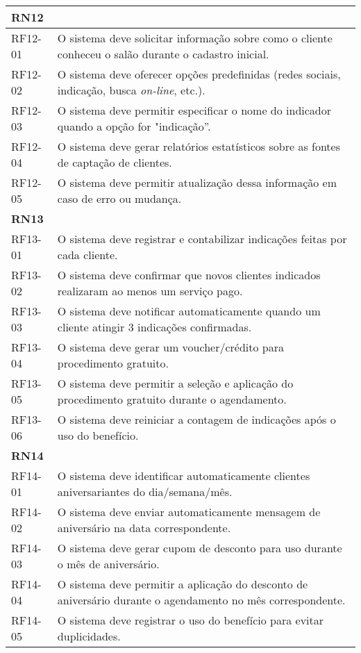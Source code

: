 \begin{longtable}{|p{}|p{}|}
	\multicolumn{2}{|l|}{\textbf{RN12}} \\ \hline
	RF12-01 & O sistema deve solicitar informação sobre como o cliente conheceu o salão durante o cadastro inicial. \\ \hline
	RF12-02 & O sistema deve oferecer opções predefinidas (redes sociais, indicação, busca \emph{on-line}, etc.). \\ \hline
	RF12-03 & O sistema deve permitir especificar o nome do indicador quando a opção for "indicação”. \\ \hline
	RF12-04 & O sistema deve gerar relatórios estatísticos sobre as fontes de captação de clientes. \\ \hline
	RF12-05 & O sistema deve permitir atualização dessa informação em caso de erro ou mudança. \\ \hline
	
	\multicolumn{2}{|l|}{\textbf{RN13}} \\ \hline
	RF13-01 & O sistema deve registrar e contabilizar indicações feitas por cada cliente. \\ \hline
	RF13-02 & O sistema deve confirmar que novos clientes indicados realizaram ao menos um serviço pago. \\ \hline
	RF13-03 & O sistema deve notificar automaticamente quando um cliente atingir 3 indicações confirmadas. \\ \hline
	RF13-04 & O sistema deve gerar um voucher/crédito para procedimento gratuito. \\ \hline
	RF13-05 & O sistema deve permitir a seleção e aplicação do procedimento gratuito durante o agendamento. \\ \hline
	RF13-06 & O sistema deve reiniciar a contagem de indicações após o uso do benefício. \\ \hline
		
	\multicolumn{2}{|l|}{\textbf{RN14}} \\ \hline
	RF14-01 & O sistema deve identificar automaticamente clientes aniversariantes do dia/semana/mês. \\ \hline
	RF14-02 & O sistema deve enviar automaticamente mensagem de aniversário na data correspondente. \\ \hline
	RF14-03 & O sistema deve gerar cupom de desconto para uso durante o mês de aniversário. \\ \hline
	RF14-04 & O sistema deve permitir a aplicação do desconto de aniversário durante o agendamento no mês correspondente. \\ \hline
	RF14-05 & O sistema deve registrar o uso do benefício para evitar duplicidades. \\ \hline
	

\end{longtable}
